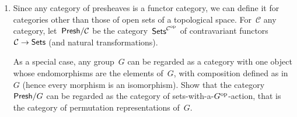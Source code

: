 \documentclass[a4paper,11pt,oneside,openany,article]{memoir}
\begin{document}
\begin{enumerate}
    \begin{proof}
      
    \end{proof}

    \begin{solution}
      \begin{description}
        \item[$\PCat/X$] By statement~\ref{subobject-1}~$\Hom(F,\Omega)$ bijects with the set of subobjects of~$F$, which is a set of objects in~$\PCat/X$. Now take~$F=h_U$, by the Yoneda lemma we have
          \begin{equation}
            \Hom(h_U,\Omega)=\Omega(U)\overset{1:1}{\longleftrightarrow}\left\{ \text{subobjects of~$h_U$} \right\}.
          \end{equation}
          But a subobject of~$h_U$ is an~$h_V$ for~$V\subseteq U$ open, so by the full and faithful embedding of~$\mathcal{U}$ into~$\PCat/X$, we have
          \begin{equation}
            \Omega(U)=\left\{ V\subseteq X\,|\,\text{$V$ open, $V\subseteq U$} \right\}.
          \end{equation}

          For a general presheaf~$F$ we now find
          \begin{equation}
            \Omega(U)=\left\{ \mathcal{P}\left( F(U) \right) \right\}.
          \end{equation}

        \item[$\SCat/X$] TODO
      \end{description}
    \end{solution}

    Compare the situation in~$\Sets=\SCat/X$ for~$X$ a one-point space, where~$\Omega$ is a two-point set and the classifying map is the characteristic map of a subset.
    
    \begin{solution}
      TODO
    \end{solution}

  \item Since any category of presheaves is a functor category, we can define it for categories other than those of open sets of a topological space. For~$\mathcal{C}$ any category, let~$\mathsf{Presh}/\mathcal{C}$ be the category~$\mathsf{Sets}^{\mathcal{C}^{\operatorname{op}}}$ of contravariant functors~$\mathcal{C}\to\mathsf{Sets}$ (and natural transformations).

    As a special case, any group~$G$ can be regarded as a category with one object whose endomorphisms are the elements of~$G$, with composition defined as in~$G$ (hence every morphism is an isomorphism). Show that the category~$\mathsf{Presh}/G$ can be regarded as the category of sets-with-a-$G^{\operatorname{op}}$-action, that is the category of permutation representations of~$G$.


\end{enumerate}
\end{document}

